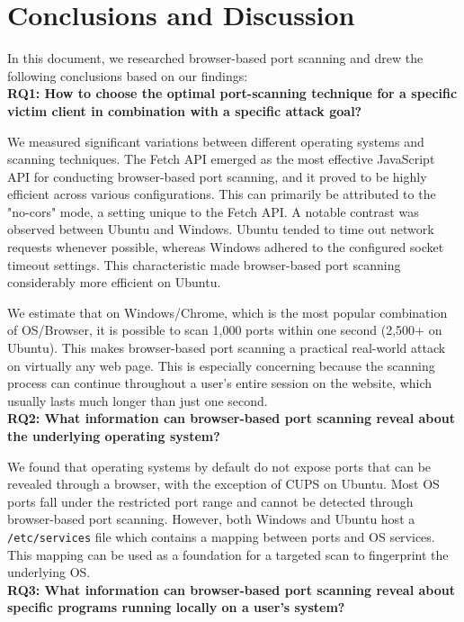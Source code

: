 \chapter{Conclusions and Discussion}

In this document, we researched browser-based port scanning and drew the following conclusions based on our findings: 
\\

\textbf{RQ1: How to choose the optimal port-scanning technique for a specific victim client in combination with a specific attack goal?}

We measured significant variations between different operating systems and scanning techniques. The Fetch API emerged as the most effective JavaScript API for conducting browser-based port scanning, and it proved to be highly efficient across various configurations. This can primarily be attributed to the "no-cors" mode, a setting unique to the Fetch API.
A notable contrast was observed between Ubuntu and Windows. Ubuntu tended to time out network requests whenever possible, whereas Windows adhered to the configured socket timeout settings. This characteristic made browser-based port scanning considerably more efficient on Ubuntu.

We estimate that on Windows/Chrome, which is the most popular combination of OS/Browser, it is possible to scan 1,000 ports within one second (2,500+ on Ubuntu). This makes browser-based port scanning a practical real-world attack on virtually any web page. This is especially concerning because the scanning process can continue throughout a user's entire session on the website, which usually lasts much longer than just one second. 
\\

\textbf{RQ2: What information can browser-based port scanning reveal about the underlying operating system?}

We found that operating systems by default do not expose ports that can be revealed through a browser, with the exception of CUPS on Ubuntu. Most OS ports fall under the restricted port range and cannot be detected through browser-based port scanning. However, both Windows and Ubuntu host a \texttt{/etc/services} file which contains a mapping between ports and OS services. This mapping can be used as a foundation for a targeted scan to fingerprint the underlying OS.
\\

\textbf{RQ3: What information can browser-based port scanning reveal about specific programs
running locally on a user’s system?}


